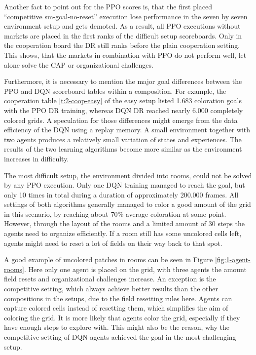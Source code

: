 Another fact to point out for the PPO scores is, that the first placed ``competitive sm-goal-no-reset'' execution lose performance in the seven by seven environment setup and gets demoted. As a result, all PPO executions without markets are placed in the first ranks of the difficult setup scoreboards. Only in the cooperation board the DR still ranks before the plain cooperation setting. This shows, that the markets in combination with PPO do not perform well, let alone solve the CAP or organizational challenges.

Furthermore, it is necessary to mention the major goal differences between the PPO and DQN scoreboard tables within a composition. For example, the cooperation table \ref{t:2-coop-easy} of the easy setup listed 1.683 coloration goals with the PPO DR training, whereas DQN DR reached nearly 6.000 completely colored grids. A speculation for those differences might emerge from the data efficiency of the DQN using a replay memory. A small environment together with two agents produces a relatively small variation of states and experiences. The results of the two learning algorithms become more similar as the environment increases in difficulty. 

The most difficult setup, the environment divided into rooms, could not be solved by any PPO execution. Only one DQN training managed to reach the goal, but only 10 times in total during a duration of approximately 200.000 frames. All settings of both algorithms generally managed to color a good amount of the grid in this scenario, by reaching about 70\% average coloration at some point. However, through the layout of the rooms and a limited amount of 30 steps the agents need to organize efficiently. If a room still has some uncolored cells left, agents might need to reset a lot of fields on their way back to that spot. 

A good example of uncolored patches in rooms can be seen in Figure \ref{fig:1-agent-rooms}. Here only one agent is placed on the grid, with three agents the amount field resets and organizational challenges increase. An exception is the competitive setting, which always achieve better results than the other compositions in the setups, due to the field resetting rules here. Agents can capture colored cells instead of resetting them, which simplifies the aim of coloring the grid. It is more likely that agents color the grid, especially if they have enough steps to explore with. This might also be the reason, why the competitive setting of DQN agents achieved the goal in the most challenging setup. 